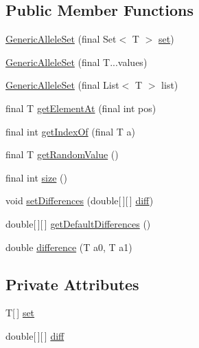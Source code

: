 \subsection*{Public Member Functions}
\begin{DoxyCompactItemize}
\item 
\hyperlink{classjenes_1_1chromosome_1_1_generic_allele_set_3_01_t_01_4_afc6f6f35af245d54ba7ad6f57a9a3893}{Generic\-Allele\-Set} (final Set$<$ T $>$ \hyperlink{classjenes_1_1chromosome_1_1_generic_allele_set_3_01_t_01_4_a2594723bce2ac24a1d465de4732418bc}{set})
\item 
\hyperlink{classjenes_1_1chromosome_1_1_generic_allele_set_3_01_t_01_4_ae7a1970427bae039c3f4ae6340b53ca7}{Generic\-Allele\-Set} (final T...\-values)
\item 
\hyperlink{classjenes_1_1chromosome_1_1_generic_allele_set_3_01_t_01_4_a8cbf2394287ce6321fcd338dc4c44a8e}{Generic\-Allele\-Set} (final List$<$ T $>$ list)
\item 
final T \hyperlink{classjenes_1_1chromosome_1_1_generic_allele_set_3_01_t_01_4_acf8f796e2243cc0b745b8d21e45ac7df}{get\-Element\-At} (final int pos)
\item 
final int \hyperlink{classjenes_1_1chromosome_1_1_generic_allele_set_3_01_t_01_4_a9b5dd0079f5d0cb76d2f89e92bde3fa6}{get\-Index\-Of} (final T a)
\item 
final T \hyperlink{classjenes_1_1chromosome_1_1_generic_allele_set_3_01_t_01_4_a2f330d71d992e0d724bc31730b56229e}{get\-Random\-Value} ()
\item 
final int \hyperlink{classjenes_1_1chromosome_1_1_generic_allele_set_3_01_t_01_4_a568ca617716496507d41e348c5bc2845}{size} ()
\item 
void \hyperlink{classjenes_1_1chromosome_1_1_generic_allele_set_3_01_t_01_4_a234b0a286a14fcaf0bf10894813465c5}{set\-Differences} (double\mbox{[}$\,$\mbox{]}\mbox{[}$\,$\mbox{]} \hyperlink{classjenes_1_1chromosome_1_1_generic_allele_set_3_01_t_01_4_a6eef912e60066cc7271f44ecc704ce1c}{diff})
\item 
double\mbox{[}$\,$\mbox{]}\mbox{[}$\,$\mbox{]} \hyperlink{classjenes_1_1chromosome_1_1_generic_allele_set_3_01_t_01_4_a9c24972536c41a2d4660d9cad2694eba}{get\-Default\-Differences} ()
\item 
double \hyperlink{classjenes_1_1chromosome_1_1_generic_allele_set_3_01_t_01_4_ace70b10ee535ccc3a7cbcd42739b8d5c}{difference} (T a0, T a1)
\end{DoxyCompactItemize}
\subsection*{Private Attributes}
\begin{DoxyCompactItemize}
\item 
T\mbox{[}$\,$\mbox{]} \hyperlink{classjenes_1_1chromosome_1_1_generic_allele_set_3_01_t_01_4_a2594723bce2ac24a1d465de4732418bc}{set}
\item 
double\mbox{[}$\,$\mbox{]}\mbox{[}$\,$\mbox{]} \hyperlink{classjenes_1_1chromosome_1_1_generic_allele_set_3_01_t_01_4_a6eef912e60066cc7271f44ecc704ce1c}{diff}
\end{DoxyCompactItemize}


